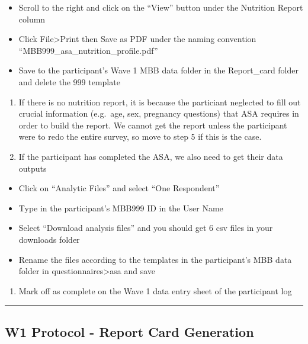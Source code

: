 \documentclass[
]{book}
\providecommand{\tightlist}{%
  \setlength{\itemsep}{0pt}\setlength{\parskip}{0pt}}
\begin{document}
\begin{itemize}
\tightlist
\item
  Scroll to the right and click on the ``View'' button under the Nutrition Report column
\item
  Click File\textgreater Print then Save as PDF under the naming convention ``MBB999\_asa\_nutrition\_profile.pdf''
\item
  Save to the participant's Wave 1 MBB data folder in the Report\_card folder and delete the 999 template
\end{itemize}

\begin{enumerate}
\def\labelenumi{\arabic{enumi}.}
\setcounter{enumi}{3}
\tightlist
\item
  If there is no nutrition report, it is because the particiant neglected to fill out crucial information (e.g.~age, sex, pregnancy questions) that ASA requires in order to build the report. We cannot get the report unless the participant were to redo the entire survey, so move to step 5 if this is the case.
\item
  If the participant has completed the ASA, we also need to get their data outputs
\end{enumerate}

\begin{itemize}
\tightlist
\item
  Click on ``Analytic Files'' and select ``One Respondent''
\item
  Type in the participant's MBB999 ID in the User Name
\item
  Select ``Download analysis files'' and you should get 6 csv files in your downloads folder
\item
  Rename the files according to the templates in the participant's MBB data folder in questionnaires\textgreater asa and save
\end{itemize}

\begin{enumerate}
\def\labelenumi{\arabic{enumi}.}
\setcounter{enumi}{5}
\tightlist
\item
  Mark off as complete on the Wave 1 data entry sheet of the participant log
\end{enumerate}

\begin{center}\rule{0.5\linewidth}{0.5pt}\end{center}

\hypertarget{w1-protocol---report-card-generation}{%
\subsection{W1 Protocol - Report Card Generation}\label{w1-protocol---report-card-generation}}
\end{document}
